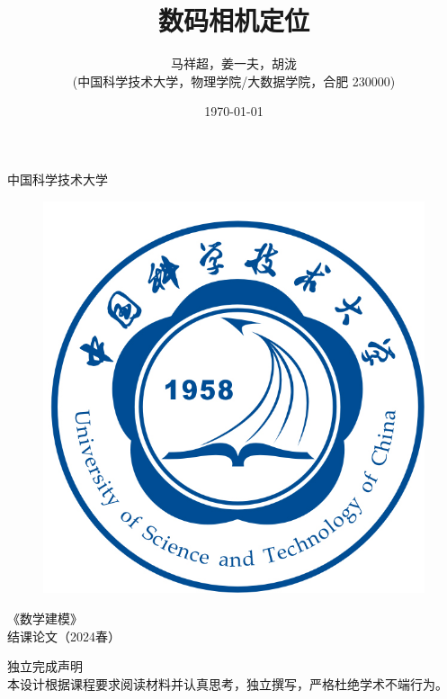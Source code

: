 \documentclass{article}
\title{{\heiti\huge{数码相机定位}}}
\author{\large{马祥超，姜一夫，胡泷}\\(中国科学技术大学，物理学院/大数据学院，合肥 230000)}
\date{\today}
\numberwithin{equation}{section}						%
\numberwithin{figure}{section}							%
\begin{document}
\begin{sloppypar}
	\thispagestyle{empty}
	\begin{center}
		\parbox[t][3cm][c]{\textwidth}{
		\begin{center}
				{\kaishu\Huge 中国科学技术大学}
		\end{center}}
		\parbox[t][8cm][c]{\textwidth}{\huge
		\begin{center} 
				\begin{figure}[H]
					\centering
					\includegraphics[width=0.4\linewidth]{ustcblue}
				\end{figure}
		\end{center} }
		\parbox[t][2cm][t]{\textwidth}{
		\begin{center}  
				{\kaishu\huge 《数学建模》\\结课论文（2024春）}
		\end{center} }
		
		\parbox[t][5cm][b]{0.7\textwidth}{
			{\Large{} }  }
		
		\parbox[t][5cm][c]{\textwidth}{ {\large
		\begin{center}
					{\Large\heiti 独立完成声明}
					\\
					本设计根据课程要求阅读材料并认真思考，独立撰写，严格杜绝学术不端行为。
		\end{center} } }
	\end{center}
	\clearpage
	\maketitle
	

\end{sloppypar}
\end{document}
